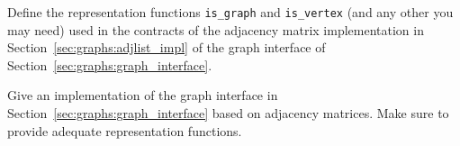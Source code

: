 \begin{exercise}
  Define the representation functions \lstinline'is_graph' and
  \lstinline'is_vertex' (and any other you may need) used in the
  contracts of the adjacency matrix implementation in
  Section~\ref{sec:graphs:adjlist_impl} of the graph interface of
  Section~\ref{sec:graphs:graph_interface}.
\end{exercise}

\begin{exercise}
  Give an implementation of the graph interface in
  Section~\ref{sec:graphs:graph_interface} based on adjacency matrices.  Make
  sure to provide adequate representation functions.
\end{exercise}
